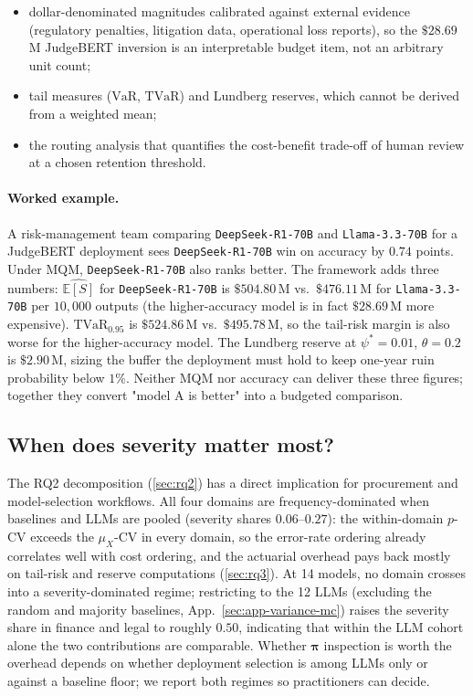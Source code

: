 \documentclass[11pt]{article}
\newcommand{\ES}{\mathbb{E}[S]}
\newcommand{\VaR}{\mathrm{VaR}}
\newcommand{\TVaR}{\mathrm{TVaR}}
\newcommand{\bpi}{\boldsymbol{\pi}}
\begin{document}
\begin{itemize}
  \item dollar-denominated magnitudes calibrated against external
    evidence (regulatory penalties, litigation data, operational
    loss reports), so the $\$28.69$\,M JudgeBERT inversion is an
    interpretable budget item, not an arbitrary unit count;
  \item tail measures ($\VaR$, $\TVaR$) and Lundberg reserves,
    which cannot be derived from a weighted mean;
  \item the routing analysis that quantifies the cost-benefit
    trade-off of human review at a chosen retention threshold.
\end{itemize}

\paragraph{Worked example.}
A risk-management team comparing \texttt{DeepSeek-R1-70B} and \texttt{Llama-3.3-70B}
for a JudgeBERT deployment sees \texttt{DeepSeek-R1-70B} win on accuracy
by $0.74$ points. Under MQM, \texttt{DeepSeek-R1-70B} also ranks better.
The framework adds three numbers: $\widehat{\ES}$ for
\texttt{DeepSeek-R1-70B} is $\$504.80$\,M vs.\ $\$476.11$\,M for
\texttt{Llama-3.3-70B} per $10{,}000$ outputs (the higher-accuracy model
is in fact $\$28.69$\,M more expensive). $\TVaR_{0.95}$ is
$\$524.86$\,M vs.\ $\$495.78$\,M, so the tail-risk margin is also
worse for the higher-accuracy model. The Lundberg reserve at
$\psi^\ast{=}0.01$, $\theta{=}0.2$ is $\$2.90$\,M, sizing the
buffer the deployment must hold to keep one-year ruin
probability below $1\%$. Neither MQM nor accuracy can deliver
these three figures; together they convert "model A is better"
into a budgeted comparison.

\subsection{When does severity matter most?}

The RQ2 decomposition (\autoref{sec:rq2}) has a direct
implication for procurement and model-selection workflows.
All four domains are frequency-dominated when baselines and
LLMs are pooled (severity shares $0.06$--$0.27$): the within-domain
$p$-CV exceeds the $\mu_X$-CV in every domain, so the
error-rate ordering already correlates well with cost ordering,
and the actuarial overhead pays back mostly on tail-risk and
reserve computations (\autoref{sec:rq3}).
At 14 models, no domain crosses into a severity-dominated
regime; restricting to the 12 LLMs (excluding the random and
majority baselines, App.~\ref{sec:app-variance-mc}) raises the
severity share in finance and legal to roughly $0.50$, indicating
that within the LLM cohort alone the two contributions are
comparable. Whether $\bpi$ inspection is worth the overhead
depends on whether deployment selection is among LLMs only or
against a baseline floor; we report both regimes so practitioners
can decide.
\end{document}
